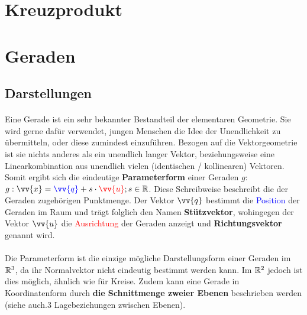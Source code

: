 \section{Kreuzprodukt}

\section{Geraden}

    \subsection{Darstellungen}

        \paragraph{} Eine Gerade ist ein sehr bekannter Bestandteil der elementaren Geometrie. Sie wird gerne dafür verwendet, jungen Menschen die Idee
        der Unendlichkeit zu übermitteln, oder diese zumindest einzuführen. Bezogen auf die Vektorgeometrie ist sie nichts anderes als ein unendlich
        langer Vektor, beziehungsweise eine Linearkombination aus unendlich vielen (identischen / kollinearen) Vektoren. Somit ergibt sich die eindeutige
        \textbf{Parameterform} einer Geraden $g$: $g:\vv{x}=\textcolor{blue}{\vv{q}}+s\cdot\textcolor{red}{\vv{u}};s\in\R$. Diese Schreibweise beschreibt
        die der Geraden zugehörigen Punktmenge. Der Vektor $\vv{q}$ bestimmt die \textcolor{blue}{Position} der Geraden im Raum und trägt folglich den
        Namen \textbf{Stützvektor}, wohingegen der Vektor $\vv{u}$ die \textcolor{red}{Ausrichtung} der Geraden anzeigt und \textbf{Richtungsvektor}
        genannt wird.
        \\
        \begin{Bemerkung}
            \paragraph{} Die Parameterform ist die einzige mögliche Darstellungsform einer Geraden im $\mathbb{R}^3$, da ihr Normalvektor nicht eindeutig bestimmt
            werden kann. Im $\mathbb{R}^2$ jedoch ist dies möglich, ähnlich wie für Kreise. Zudem kann eine Gerade in Koordinatenform durch \textbf{die
            Schnittmenge zweier Ebenen} beschrieben werden (siehe auch.3 Lagebeziehungen zwischen Ebenen\grqq).
        \end{Bemerkung}

